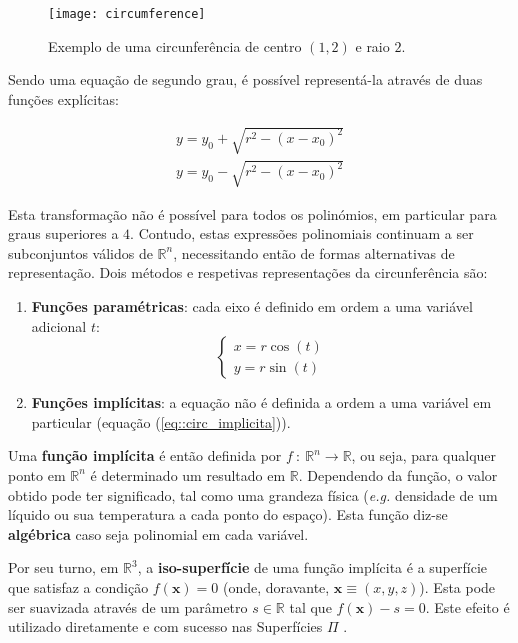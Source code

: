 \begin{figure}[!btp]
	\centering
	\texttt{[image: circumference]}
	\caption[Exemplo de uma circunferência]{Exemplo de uma circunferência de centro $(1, 2)$ e raio $2$.}
	\label{fig::circumference}
\end{figure}

Sendo uma equação de segundo grau, é possível representá-la através de duas funções explícitas:

\begin{eqnarray}
		y = y_0 + \sqrt{r^2 - (x - x_0)^2} \\
		y = y_0 - \sqrt{r^2 - (x - x_0)^2}
\end{eqnarray}

Esta transformação não é possível para todos os polinómios, em particular para graus superiores a $4$. Contudo, estas expressões polinomiais continuam a ser subconjuntos válidos de $\mathbb{R}^n$, necessitando então de formas alternativas de representação. Dois métodos e respetivas representações da circunferência são:

\begin{enumerate}
	\item \textbf{Funções paramétricas}: cada eixo é definido em ordem a uma variável adicional $t$:
	\begin{equation}
		\left\{\begin{array}{l}
			x = r\cos(t) \\
			y = r\sin(t)
		\end{array}\right.
	\label{eq::circ_parametrica}
	\end{equation}
	
	\item \textbf{Funções implícitas}: a equação não é definida a ordem a uma variável em particular (equação (\ref{eq::circ_implicita})).
\end{enumerate}

Uma \textbf{função implícita} é então definida por $f~:~\mathbb{R}^n \longrightarrow \mathbb{R}$, ou seja, para qualquer ponto em $\mathbb{R}^n$ é determinado um resultado em $\mathbb{R}$. Dependendo da função, o valor obtido pode ter significado, tal como uma grandeza física (\textit{e.g.} densidade de um líquido ou sua temperatura a cada ponto do espaço). Esta função diz-se \textbf{algébrica} caso seja polinomial em cada variável.

Por seu turno, em $\mathbb{R}^3$, a \textbf{iso-superfície} de uma função implícita é a superfície que satisfaz a condição $f(\mathbf{x}) = 0$ (onde, doravante, $\mathbf{x} \equiv (x,y,z)$). Esta pode ser suavizada através de um parâmetro $s \in \mathbb{R}$ tal que $f(\mathbf{x}) - s = 0$. Este efeito é utilizado diretamente e com sucesso nas Superfícies $\Pi$ \cite{Raposo2019}.


